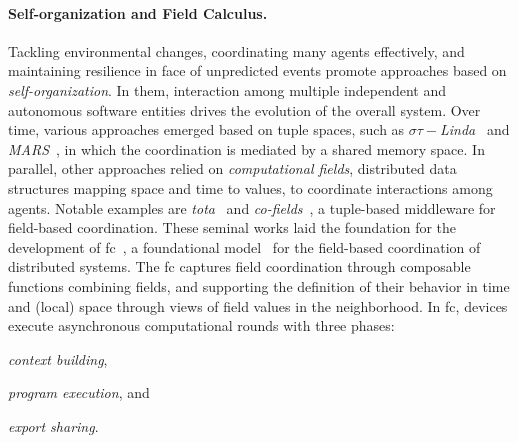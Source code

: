\documentclass[12pt, a4paper]{article}
\newenvironment{inlinelist}{\begin{enumerate*}[label=\emph{(\roman*)}]}{\end{enumerate*}}
\begin{document}
\sloppypar
\paragraph{Self-organization and Field Calculus.}

Tackling environmental changes, coordinating many agents effectively, and maintaining resilience
in face of unpredicted events promote approaches based on \emph{self-organization}.
%
In them,
interaction among multiple independent and autonomous software entities drives the evolution of the overall system.
%
Over time,
various approaches emerged based on tuple spaces,
such as \textit{$\sigma\tau-$Linda}~\cite{ViroliCoordination2012} and \textit{MARS}~\cite{mars},
in which the coordination is mediated by a shared memory space.
%
In parallel,
other approaches relied on \emph{computational fields},
distributed data structures mapping space and time to values,
to coordinate interactions among agents.
%
Notable examples are \emph{\ac{tota}}~\cite{tota} and \emph{co-fields}~\cite{MameiZL04},
a tuple-based middleware
for field-based coordination.
%
These seminal works laid the foundation for the development of \ac{fc}~\cite{JLAMP2019},
a foundational model~\cite{TOCL2019} for the field-based coordination of distributed systems.
%
The \ac{fc} captures field coordination through composable functions
combining fields, and supporting the definition of their behavior in time
and (local) space through views of field values in the neighborhood.
%
%
In \ac{fc}, devices execute asynchronous computational rounds with three phases:
\begin{inlinelist}
    \item \emph{context building},
    \item \emph{program execution}, and
    \item \emph{export sharing}.
\end{inlinelist}
%

\sloppypar
\end{document}

